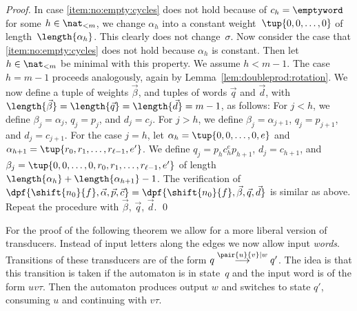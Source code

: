 \begin{proof}
  In case \ref{item:no:empty:cycles} does not hold 
  because of $c_h = \emptyword$ for some $h \in \nat_{<m}$,
  we change $\alpha_h$ into a constant weight~$\tup{0,0,\ldots,0}$ 
  of length~$\length{\alpha_h}$. This clearly does not change~$\sigma$.
Now consider the case that \ref{item:no:empty:cycles} does not hold 
  because $\alpha_h$ is constant.
  Then let $h \in \nat_{<m}$ be minimal with this property.
  We assume $h < m-1$. 
  The case $h = m-1$ proceeds analogously, again by Lemma~\ref{lem:doubleprod:rotation}.
  We now define a tuple of weights $\vec{\beta}$, 
  and tuples of words $\vec{q}$ and $\vec{d}$, 
  with $\length{\vec{\beta}} = \length{\vec{q}} = \length{\vec{d}} = m - 1$,
  as follows:
  For $j < h$, we define $\beta_j = \alpha_j$, $q_j = p_j$, and $d_j = c_j$.
  For $j > h$, we define $\beta_j = \alpha_{j+1}$, $q_j = p_{j+1}$, and $d_j = c_{j+1}$.
For the case $j = h$, 
  let $\alpha_h = \tup{0,0,\ldots,0,e}$
  and $\alpha_{h+1} = \tup{r_0,r_1,\ldots,r_{\ell-1},e'}$.
  We define $q_j = p_h c_h^e p_{h+1}$, 
  $d_j = c_{h+1}$, and 
  $\beta_j = \tup{0,0,\ldots,0,r_0,r_1,\ldots,r_{\ell-1},e'}$ of length $\length{\alpha_h} + \length{\alpha_{h+1}} - 1$.
  The verification of $\dpf{\shift{n_0}{f},\vec{\alpha},\vec{p},\vec{c}} = \dpf{\shift{n_0}{f},\vec{\beta},\vec{q},\vec{d}}$
  is similar as above.
  Repeat the procedure with $\vec{\beta}$, $\vec{q}$, $\vec{d}$.
  \qed  
\end{proof}


For the proof of the following theorem we 
allow for a more liberal version of transducers.
Instead of input letters along the edges we now allow input \emph{words}.
Transitions of these transducers are of the form $q \stackrel{\pair{u}{v}|w}{\longrightarrow} q'$.
The idea is that this transition is taken if the automaton is in state~$q$ and
the input word is of the form $uv\tau$.
Then the automaton produces output $w$ and switches to state $q'$, consuming $u$ and continuing with $v\tau$.

